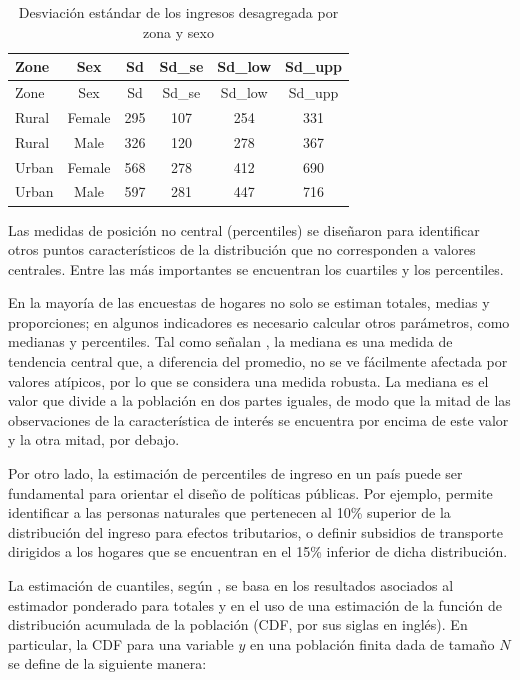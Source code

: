 \documentclass[
  spanish,
  12pt,
]{book}
\begin{document}
\begin{longtable}[]{@{}lccccc@{}}
\caption{\label{tab:tab-sd-ingreso-zona-sexo}Desviación estándar de los ingresos desagregada por zona y sexo}\tabularnewline
\toprule\noalign{}
Zone & Sex & Sd & Sd\_se & Sd\_low & Sd\_upp \\
\midrule\noalign{}
\endfirsthead
\toprule\noalign{}
Zone & Sex & Sd & Sd\_se & Sd\_low & Sd\_upp \\
\midrule\noalign{}
\endhead
\bottomrule\noalign{}
\endlastfoot
Rural & Female & 295 & 107 & 254 & 331 \\
Rural & Male & 326 & 120 & 278 & 367 \\
Urban & Female & 568 & 278 & 412 & 690 \\
Urban & Male & 597 & 281 & 447 & 716 \\
\end{longtable}

Las medidas de posición no central (percentiles) se diseñaron para identificar otros puntos característicos de la distribución que no corresponden a valores centrales. Entre las más importantes se encuentran los cuartiles y los percentiles.

En la mayoría de las encuestas de hogares no solo se estiman totales, medias y proporciones; en algunos indicadores es necesario calcular otros parámetros, como medianas y percentiles. Tal como señalan \citet{tellez2015estadistica}, la mediana es una medida de tendencia central que, a diferencia del promedio, no se ve fácilmente afectada por valores atípicos, por lo que se considera una medida robusta. La mediana es el valor que divide a la población en dos partes iguales, de modo que la mitad de las observaciones de la característica de interés se encuentra por encima de este valor y la otra mitad, por debajo.

Por otro lado, la estimación de percentiles de ingreso en un país puede ser fundamental para orientar el diseño de políticas públicas. Por ejemplo, permite identificar a las personas naturales que pertenecen al 10\% superior de la distribución del ingreso para efectos tributarios, o definir subsidios de transporte dirigidos a los hogares que se encuentran en el 15\% inferior de dicha distribución.

La estimación de cuantiles, según \citet{loomis2005}, se basa en los resultados asociados al estimador ponderado para totales y en el uso de una estimación de la función de distribución acumulada de la población (CDF, por sus siglas en inglés). En particular, la CDF para una variable \(y\) en una población finita dada de tamaño \(N\) se define de la siguiente manera:
\end{document}
